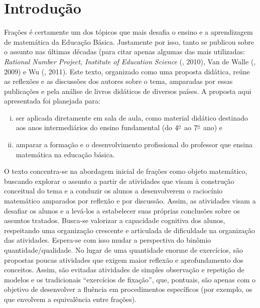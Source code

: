 
%
%
% 

\setcounter{chapter}{-1}
\chapter{Introdução}


Frações é certamente um dos tópicos que mais desafia o ensino e a aprendizagem de matemática da Educação Básica. Justamente por isso, tanto se publicou sobre o assunto nas últimas décadas (para citar apenas algumas das mais utilizadas:  {\it Rational Number Project, Institute of Education Science} (\cite{IES}, 2010), Van de Walle (\cite{Walle}, 2009) e Wu (\cite{Wu}, 2011). Este texto, organizado como uma proposta didática,  reúne as reflexões e as discussões dos autores sobre o tema, amparadas por essas publicações e pela análise de livros didáticos de diversos países. A proposta aqui apresentada foi planejada para:

\begin{enumerate}[(i)]
\item  ser aplicada diretamente em sala de aula, como material didático destinado aos anos intermediários do ensino fundamental (do $4^{\textrm{\underline{o}}}$ ao $7^{\textrm{\underline{o}}}$ ano) e
\item amparar a formação e o desenvolvimento profissional do professor que ensina matemática na educação básica.
\end{enumerate}

O texto concentra-se na abordagem inicial de frações como objeto matemático, buscando explorar o assunto a partir de atividades que visam à construção conceitual do tema e a conduzir os alunos a desenvolverem o raciocínio matemático amparados por reflexão e por discussão. Assim, as atividades visam a desafiar os alunos e a levá-los a estabelecer suas próprias conclusões sobre os assuntos tratados. Busca-se valorizar a capacidade cognitiva dos alunos, respeitando uma organização crescente e articulada de diﬁculdade na organização das atividades. Espera-se com isso mudar a perspectiva do binômio quantidade/qualidade. No lugar de uma quantidade enorme de exercícios, são propostas poucas  atividades que exigem maior reflexão e aprofundamento dos conceitos. Assim, são evitadas atividades de simples observação e repetição de modelos e os tradicionais ``exercícios de fixação'', que, pontuais, são apenas com o objetivo de desenvolver a fluência em procedimentos específicos (por exemplo, os que envolvem a equivalência entre frações).

